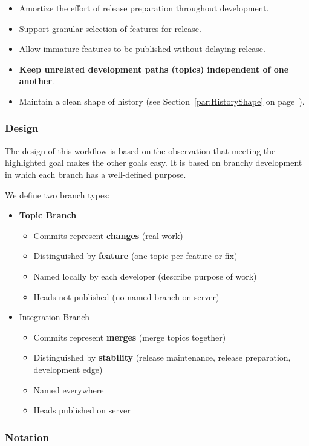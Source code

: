 \begin{itemize}
\item Amortize the effort of release preparation throughout development.
\item Support granular selection of features for release.
\item Allow immature features to be published without delaying release.
\item \textbf{Keep unrelated development paths (topics) independent of one
another}.
\item Maintain a clean shape of history (see Section~\ref{par:HistoryShape} on
page~\pageref{par:HistoryShape}).
\end{itemize}


\subsubsection{Design}
\label{subsubsec:Design}

The design of this workflow is based on the observation that meeting the
highlighted goal makes the other goals easy. It is based on branchy development
in which each branch has a well-defined purpose.

We define two branch types:
\begin{itemize}
\item \textbf{Topic Branch}
\begin{itemize}
\item Commits represent \textbf{changes} (real work)
\item Distinguished by \textbf{feature} (one topic per feature or fix)
\item Named locally by each developer (describe purpose of work)
\item Heads not published (no named branch on server)
\end{itemize}
\item Integration Branch
\begin{itemize}
\item Commits represent \textbf{merges} (merge topics together)
\item Distinguished by \textbf{stability} (release maintenance, release
preparation, development edge)
\item Named everywhere
\item Heads published on server
\end{itemize}
\end{itemize}


\subsubsection{Notation}
\label{subsubsec:Notation}

